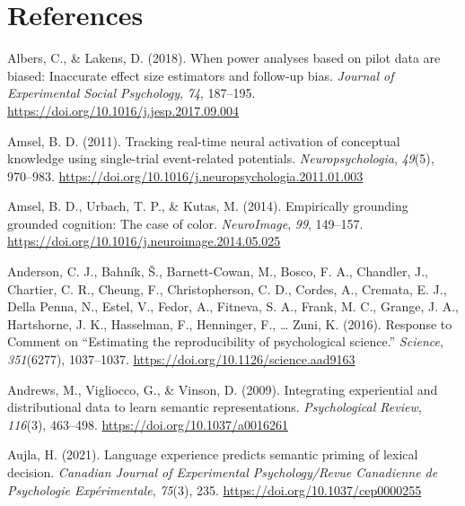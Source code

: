 \documentclass[
  12pt,
  man,floatsintext]{apa7}
\newlength{\cslhangindent}
\newlength{\cslentryspacingunit} %
\newenvironment{CSLReferences}[2] %
 {%
  \setlength{\parindent}{0pt}
  \ifodd #1
  \let\oldpar\par
  \def\par{\hangindent=\cslhangindent\oldpar}
  \fi
  \setlength{\parskip}{#2\cslentryspacingunit}
 }%
 {}
\begin{document}
\hypertarget{references}{%
\section{References}\label{references}}

\hypertarget{refs}{}
\begin{CSLReferences}{1}{0}
\leavevmode{}%
Albers, C., \& Lakens, D. (2018). When power analyses based on pilot data are biased: {Inaccurate} effect size estimators and follow-up bias. \emph{Journal of Experimental Social Psychology}, \emph{74}, 187--195. \url{https://doi.org/10.1016/j.jesp.2017.09.004}

\leavevmode{}%
Amsel, B. D. (2011). Tracking real-time neural activation of conceptual knowledge using single-trial event-related potentials. \emph{Neuropsychologia}, \emph{49}(5), 970--983. \url{https://doi.org/10.1016/j.neuropsychologia.2011.01.003}

\leavevmode{}%
Amsel, B. D., Urbach, T. P., \& Kutas, M. (2014). Empirically grounding grounded cognition: {The} case of color. \emph{NeuroImage}, \emph{99}, 149--157. \url{https://doi.org/10.1016/j.neuroimage.2014.05.025}

\leavevmode{}%
Anderson, C. J., Bahník, Š., Barnett-Cowan, M., Bosco, F. A., Chandler, J., Chartier, C. R., Cheung, F., Christopherson, C. D., Cordes, A., Cremata, E. J., Della Penna, N., Estel, V., Fedor, A., Fitneva, S. A., Frank, M. C., Grange, J. A., Hartshorne, J. K., Hasselman, F., Henninger, F., \ldots{} Zuni, K. (2016). Response to {Comment} on {``{Estimating} the reproducibility of psychological science.''} \emph{Science}, \emph{351}(6277), 1037--1037. \url{https://doi.org/10.1126/science.aad9163}

\leavevmode{}%
Andrews, M., Vigliocco, G., \& Vinson, D. (2009). Integrating experiential and distributional data to learn semantic representations. \emph{Psychological Review}, \emph{116}(3), 463--498. \url{https://doi.org/10.1037/a0016261}

\leavevmode{}%
Aujla, H. (2021). Language experience predicts semantic priming of lexical decision. \emph{Canadian Journal of Experimental Psychology/Revue Canadienne de Psychologie Expérimentale}, \emph{75}(3), 235. \url{https://doi.org/10.1037/cep0000255}


\end{CSLReferences}
\end{document}
